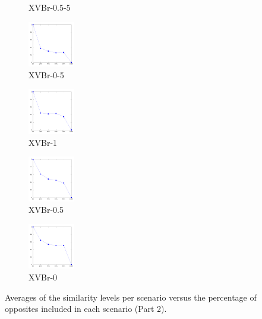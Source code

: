 \documentclass[a4paper,10pt]{article}
\begin{document}
\begin{figure}[ht]
{\begin{subfigure}[b]{2.5cm}
\caption{XVBr-0.5-5}
\end{subfigure} 
\begin{subfigure}[b]{2.5cm}
\centering
\includegraphics[height=2cm]{allcat_XVBr-0-5.pdf}
\caption{XVBr-0-5}
\end{subfigure} 
\begin{subfigure}[b]{2.5cm}
\centering
\includegraphics[height=2cm]{allcat_XVBr-1.pdf}
\caption{XVBr-1}
\end{subfigure} 
\begin{subfigure}[b]{2.5cm}
\centering
\includegraphics[height=2cm]{allcat_XVBr-0_5.pdf}
\caption{XVBr-0.5}
\end{subfigure} 
\begin{subfigure}[b]{2.5cm}
\centering
\includegraphics[height=2cm]{allcat_XVBr-0.pdf}
\caption{XVBr-0}
\end{subfigure} 
\caption{Averages of the similarity levels per scenario versus the percentage of opposites included in each scenario (Part 2).}
}\end{figure}
\pagebreak
\end{document}
